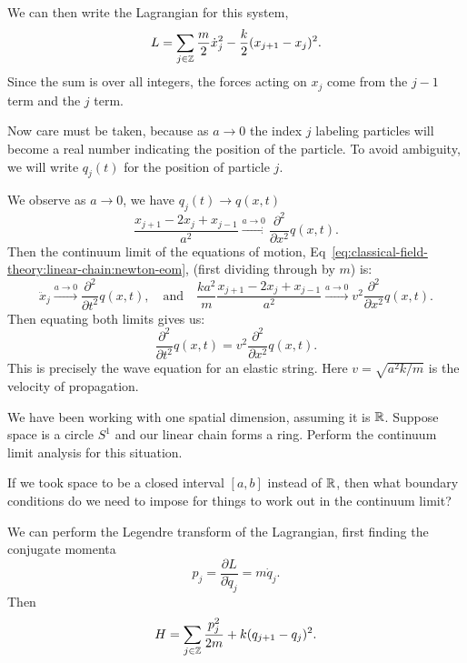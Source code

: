 We can then write the Lagrangian for this system,
\begin{equation}
L = \sum_{j\in\mathbb{Z}}\frac{m}{2}\dot{x}^{2}_{j} - \frac{k}{2}(x_{j+1}-x_{j})^{2}.
\end{equation}
Since the sum is over all integers, the forces acting on $x_{j}$ come
from the $j-1$ term and the $j$ term.

Now care must be taken, because as $a\to 0$ the index $j$ labeling
particles will become a real number indicating the position of the
particle. To avoid ambiguity, we will write $q_{j}(t)$ for the position
of particle $j$.

We observe as $a\to0$, we have $q_{j}(t)\to q(x,t)$
\begin{equation}
\frac{x_{j+1}-2x_{j}+x_{j-1}}{a^{2}}\xrightarrow{a\to0}\frac{\partial^{2}}{\partial x^{2}}q(x,t).
\end{equation}
Then the continuum limit of the equations of motion,
Eq~\eqref{eq:classical-field-theory:linear-chain:newton-eom}, (first
dividing through by $m$) is:
\begin{equation}
\ddot{x}_{j}\xrightarrow{a\to0}\frac{\partial^{2}}{\partial t^{2}}q(x,t),
\quad\mbox{and}\quad\frac{ka^{2}}{m}\frac{x_{j+1}-2x_{j}+x_{j-1}}{a^{2}}
\xrightarrow{a\to0}v^{2}
\frac{\partial^{2}}{\partial x^{2}}q(x,t).
\end{equation}
Then equating both limits gives us:
\begin{equation}
\frac{\partial^{2}}{\partial t^{2}}q(x,t) = v^{2}
\frac{\partial^{2}}{\partial x^{2}}q(x,t).
\end{equation}
This is precisely the wave equation for an elastic string.
Here $v=\sqrt{a^{2}k/m}$ is the velocity of propagation.

\begin{exercise}
We have been working with one spatial dimension, assuming it is $\mathbb{R}$.
Suppose space is a circle $S^{1}$ and our linear chain forms a
ring. Perform the continuum limit analysis for this situation.
\end{exercise}

\begin{exercise}
If we took space to be a closed interval $[a,b]$ instead of $\mathbb{R}$,
then what boundary conditions do we need to impose for things to work
out in the continuum limit?
\end{exercise}

We can perform the Legendre transform of the Lagrangian, first finding
the conjugate momenta
\begin{equation}
p_{j} = \frac{\partial L}{\partial\dot{q}_{j}} = m\dot{q}_{j}.
\end{equation}
Then
\begin{equation}
H = \sum_{j\in\mathbb{Z}}\frac{p_{j}^{2}}{2m} + k(q_{j+1}-q_{j})^{2}.
\end{equation}
